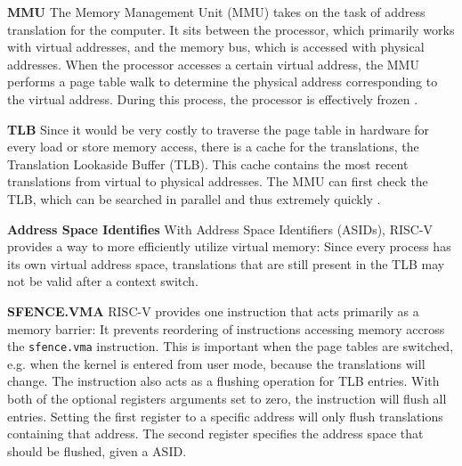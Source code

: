 
\textbf{MMU}
The Memory Management Unit (MMU) takes on the task of address translation for the computer.
It sits between the processor, which primarily works with virtual addresses, and the memory bus,
which is accessed with physical addresses. When the processor accesses a certain virtual address,
the MMU performs a page table walk to determine the physical address corresponding to the virtual
address. During this process, the processor is effectively frozen \cite{jacobVirtualMemoryContemporary1998}.


\textbf{TLB} Since it would be very costly to traverse the page table in hardware for every load or store memory access, there is a cache for the translations, the Translation Lookaside Buffer (TLB). This cache contains the most recent translations from virtual to physical addresses. The MMU can first check the TLB, which can be searched in parallel and thus extremely quickly \cite{drepper2007every,jacobVirtualMemoryContemporary1998}.




\textbf{Address Space Identifies}
With Address Space Identifiers (ASIDs), RISC-V provides a way to more efficiently utilize virtual memory:
Since every process has its own virtual address space, translations that are still present in the
TLB may not be valid after a context switch.

\textbf{SFENCE.VMA} RISC-V provides one instruction that acts primarily as a memory barrier:
It prevents reordering of instructions accessing memory accross the \texttt{sfence.vma} instruction.
This is important when the page tables are switched, e.g. when the kernel is entered from user mode,
because the translations will change.
The instruction also acts as a flushing operation for TLB entries. With both of the optional registers
arguments set to zero, the instruction will flush all entries.
Setting the first register to a specific address will only flush translations containing that address.
The second register specifies the address space that should be flushed, given a ASID.

